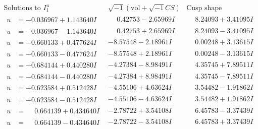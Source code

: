 \documentclass[1p]{elsarticle_modified}
\theoremstyle{definition}
\newcommand{\I}{\sqrt{-1}}
\begin{document}
$$\begin{array}{c|c|c}  
\text{Solutions to }I^u_{1}& \I (\text{vol} + \sqrt{-1}CS) & \text{Cusp shape}\\
 \hline 
\begin{aligned}
u &= -0.036967 + 1.143640 I\end{aligned}
 & \phantom{-}0.42753 - 2.65969 I & \phantom{-}8.24093 + 3.41095 I \\ \hline\begin{aligned}
u &= -0.036967 - 1.143640 I\end{aligned}
 & \phantom{-}0.42753 + 2.65969 I & \phantom{-}8.24093 - 3.41095 I \\ \hline\begin{aligned}
u &= -0.660133 + 0.477624 I\end{aligned}
 & -8.57548 - 2.18961 I & \phantom{-}0.00248 + 3.13615 I \\ \hline\begin{aligned}
u &= -0.660133 - 0.477624 I\end{aligned}
 & -8.57548 + 2.18961 I & \phantom{-}0.00248 - 3.13615 I \\ \hline\begin{aligned}
u &= -0.684144 + 0.440280 I\end{aligned}
 & -4.27384 - 8.98491 I & \phantom{-}4.35745 + 7.89511 I \\ \hline\begin{aligned}
u &= -0.684144 - 0.440280 I\end{aligned}
 & -4.27384 + 8.98491 I & \phantom{-}4.35745 - 7.89511 I \\ \hline\begin{aligned}
u &= -0.623584 + 0.512428 I\end{aligned}
 & -4.55106 + 4.63624 I & \phantom{-}3.54482 - 1.91862 I \\ \hline\begin{aligned}
u &= -0.623584 - 0.512428 I\end{aligned}
 & -4.55106 - 4.63624 I & \phantom{-}3.54482 + 1.91862 I \\ \hline\begin{aligned}
u &= \phantom{-}0.664139 + 0.434640 I\end{aligned}
 & -2.78722 + 3.54108 I & \phantom{-}6.45783 - 3.37439 I \\ \hline\begin{aligned}
u &= \phantom{-}0.664139 - 0.434640 I\end{aligned}
 & -2.78722 - 3.54108 I & \phantom{-}6.45783 + 3.37439 I \\ \hline\begin{aligned}

\end{aligned}
\end{array}$$
\end{document}
